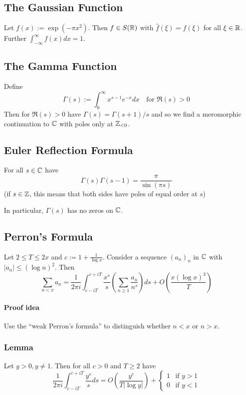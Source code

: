 \subsection{The Gaussian Function}
Let $f(x) := \exp(-\pi x^2)$. Then $f \in S(\mathbb{R})$ with $\hat{f}(\xi) = f(\xi)$ for all $\xi \in \mathbb{R}$.
Further $\int_{-\infty}^\infty f(x) dx = 1$.

\subsection{The Gamma Function}
Define
\begin{equation*}
    \Gamma(s) := \int_0^\infty x^{s - 1} e^{-x} dx \quad \text{for $\Re(s) > 0$}
\end{equation*}
Then for $\Re(s) > 0$ have $\Gamma(s) = \Gamma(s + 1) / s$ and so we find a meromorphic continuation to $\mathbb{C}$ with poles only at $\mathbb{Z}_{< 0}$.

\subsection{Euler Reflection Formula}
For all $s \in \mathbb{C}$ have
\begin{equation*}
    \Gamma(s)\Gamma(s - 1) = \frac \pi {\sin(\pi s)}
\end{equation*}
(if $s \in \mathbb{Z}$, this means that both sides have poles of equal order at $s$)

In particular, $\Gamma(s)$ has no zeros on $\mathbb{C}$.

\subsection{Perron's Formula}
Let $2 \leq T \leq 2x$ and $c := 1 + \frac 1 {\log x}$. Consider a sequence $(a_n)_n$ in $\mathbb{C}$ with $|a_n| \leq (\log n)^2$. Then
\begin{equation*}
    \sum_{n < x} a_n = \frac 1 {2\pi i} \int_{c - iT}^{c + iT} \frac {x^s} s \left( \sum_{n \geq 1} \frac {a_n} {n^s} \right) ds + O\left(\frac {x(\log x)^3} T\right)
\end{equation*}
\paragraph{Proof idea} Use the ``weak Perron's formula'' to distinguish whether $n < x$ or $n > x$.
\subsubsection*{Lemma}
Let $y > 0, y \neq 1$. Then for all $c > 0$ and $T \geq 2$ have
\begin{equation*}
    \frac 1 {2\pi i} \int_{c - iT}^{c + iT} \frac {y^s} s ds = O\left( \frac {y^c} {T |\log y|} \right) + \begin{cases}
        1 & \text{if $y > 1$} \\
        0 & \text{if $y < 1$}
    \end{cases}
\end{equation*}

